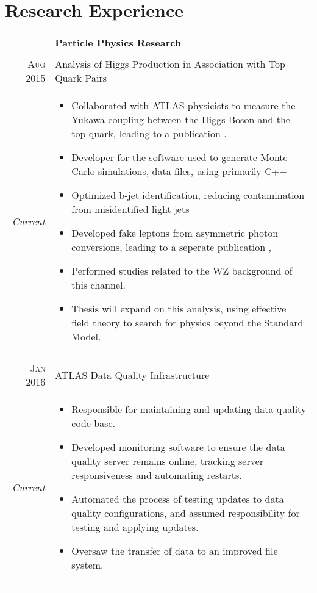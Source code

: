 \documentclass[a4paper,10pt]{article}
\begin{document}
\section{Research Experience}
\begin{longtable}{rp{11cm}}

    & \textbf{Particle Physics Research} \\\\

    \textsc{Aug 2015}   &   Analysis of Higgs Production in Association with Top Quark Pairs \\
    \emph{Current}      &   \footnotesize{
    \begin{itemize}[leftmargin=*, topsep=0pt]
        \item Collaborated with ATLAS physicists to measure the Yukawa coupling between the Higgs Boson and the top quark, leading to a publication \cite{ttH_paper}. 
        \item Developer for the software used to generate Monte Carlo simulations, data files, using primarily C++ 
        \item Optimized b-jet identification, reducing contamination from misidentified light jets 
        \item Developed  fake leptons from asymmetric photon conversions, leading to a seperate publication \cite{raretop},
        \item Performed studies related to the WZ background of this channel. 
        \item Thesis will expand on this analysis, using effective field theory to search for physics beyond the Standard Model.
    \end{itemize}
    }\\\\
         
    \textsc{Jan 2016}   &   ATLAS Data Quality Infrastructure \\
    \emph{Current}      &   \footnotesize{
    \begin{itemize}[leftmargin=*,topsep=0pt]
        \item Responsible for maintaining and updating data quality code-base. 
        \item Developed monitoring software to ensure the data quality server remains online, tracking server responsiveness and automating restarts. 
        \item Automated the process of testing updates to data quality configurations, and assumed responsibility for testing and applying updates. 
        \item Oversaw the transfer of data to an improved file system.
    \end{itemize}
    }\\\\
         

\end{longtable}
\end{document}

